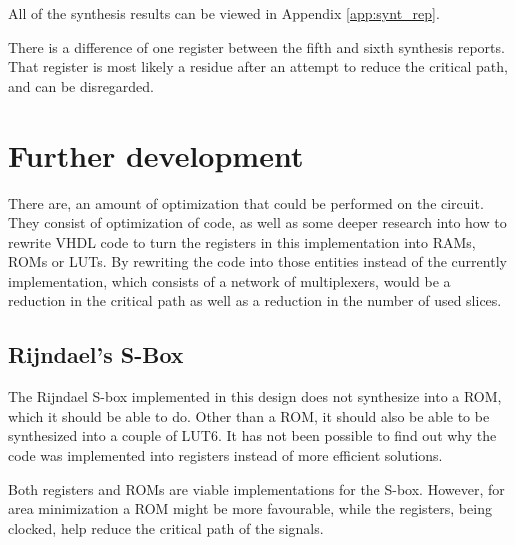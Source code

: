 
All of the synthesis results can be viewed in Appendix 
\ref{app:synt_rep}.

There is a difference of one register between the fifth and sixth 
synthesis reports. That register is most likely a residue after an 
attempt to reduce the critical path, and can be disregarded.

\section{Further development}
There are, an amount of optimization that could be performed on the 
circuit. They consist of optimization of code, as well as some deeper 
research into how to rewrite VHDL code to turn the registers in this 
implementation into RAMs, ROMs or LUTs. By rewriting the code into 
those entities instead of the currently implementation, which consists 
of a network of multiplexers, would be a reduction in the critical path
as well as a reduction in the number of used slices.

\subsection{Rijndael's S-Box}
The Rijndael S-box implemented in this design does not synthesize into 
a ROM, which it should be able to do. Other than a ROM, it should also 
be able to be synthesized into a couple of LUT6. It has not been 
possible to find out why the code was implemented into registers 
instead of more efficient solutions.

Both registers and ROMs are viable implementations for the S-box. 
However, for area minimization a ROM might be more favourable, while 
the registers, being clocked, help reduce the critical path of the 
signals.

